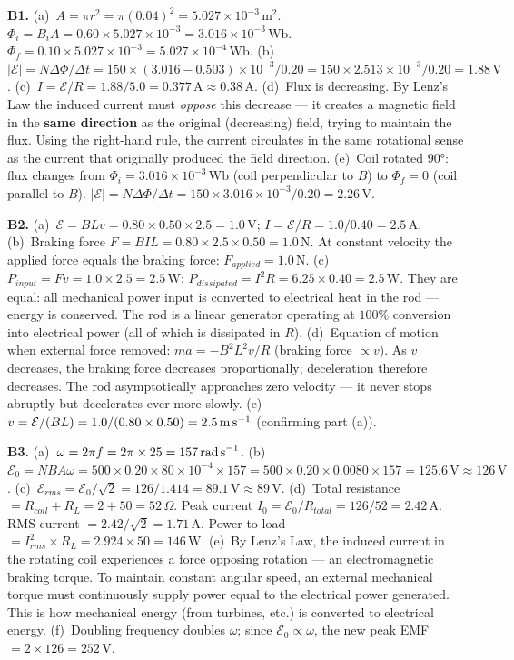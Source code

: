\textbf{B1.}
(a)~$A=\pi r^2=\pi(0.04)^2=5.027\times10^{-3}\,\text{m}^2$.
$\Phi_i=B_iA=0.60\times5.027\times10^{-3}
=3.016\times10^{-3}\,\text{Wb}$.
$\Phi_f=0.10\times5.027\times10^{-3}
=5.027\times10^{-4}\,\text{Wb}$. \quad
(b)~$|\mathcal{E}|=N\Delta\Phi/\Delta t
=150\times(3.016-0.503)\times10^{-3}/0.20
=150\times2.513\times10^{-3}/0.20
=1.88\,\text{V}$. \quad
(c)~$I=\mathcal{E}/R=1.88/5.0=0.377\,\text{A}
\approx0.38\,\text{A}$. \quad
(d)~Flux is decreasing. By Lenz's Law the induced
current must \textit{oppose} this decrease --- it creates
a magnetic field in the \textbf{same direction} as the
original (decreasing) field, trying to maintain the
flux. Using the right-hand rule, the current circulates
in the same rotational sense as the current that
originally produced the field direction. \quad
(e)~Coil rotated $90°$: flux changes from
$\Phi_i=3.016\times10^{-3}\,\text{Wb}$ (coil
perpendicular to $B$) to $\Phi_f=0$ (coil parallel to
$B$).
$|\mathcal{E}|=N\Delta\Phi/\Delta t
=150\times3.016\times10^{-3}/0.20=2.26\,\text{V}$.

\textbf{B2.}
(a)~$\mathcal{E}=BLv=0.80\times0.50\times2.5
=1.0\,\text{V}$;
$I=\mathcal{E}/R=1.0/0.40=2.5\,\text{A}$. \quad
(b)~Braking force $F=BIL
=0.80\times2.5\times0.50=1.0\,\text{N}$.
At constant velocity the applied force equals the
braking force: $F_{applied}=1.0\,\text{N}$. \quad
(c)~$P_{input}=Fv=1.0\times2.5=2.5\,\text{W}$;
$P_{dissipated}=I^2R=6.25\times0.40=2.5\,\text{W}$.
They are equal: all mechanical power input is
converted to electrical heat in the rod ---
energy is conserved. The rod is a linear generator
operating at $100\%$ conversion into electrical
power (all of which is dissipated in $R$). \quad
(d)~Equation of motion when external force removed:
$ma=-B^2L^2v/R$ (braking force $\propto v$).
As $v$ decreases, the braking force decreases
proportionally; deceleration therefore decreases.
The rod asymptotically approaches zero velocity
--- it never stops abruptly but decelerates
ever more slowly. \quad
(e)~$v=\mathcal{E}/(BL)=1.0/(0.80\times0.50)
=2.5\,\text{m\,s}^{-1}$
(confirming part (a)).

\textbf{B3.}
(a)~$\omega=2\pi f=2\pi\times25=157\,\text{rad\,s}^{-1}$.
\quad
(b)~$\mathcal{E}_0=NBA\omega
=500\times0.20\times80\times10^{-4}\times157
=500\times0.20\times0.0080\times157=125.6\,\text{V}
\approx126\,\text{V}$. \quad
(c)~$\mathcal{E}_{rms}=\mathcal{E}_0/\sqrt{2}
=126/1.414=89.1\,\text{V}\approx89\,\text{V}$. \quad
(d)~Total resistance $=R_{coil}+R_L=2+50=52\,\Omega$.
Peak current $I_0=\mathcal{E}_0/R_{total}
=126/52=2.42\,\text{A}$.
RMS current $=2.42/\sqrt{2}=1.71\,\text{A}$.
Power to load $=I_{rms}^2\times R_L
=2.924\times50=146\,\text{W}$. \quad
(e)~By Lenz's Law, the induced current in the rotating
coil experiences a force opposing rotation ---
an electromagnetic braking torque. To maintain constant
angular speed, an external mechanical torque must
continuously supply power equal to the electrical power
generated. This is how mechanical energy (from turbines,
etc.) is converted to electrical energy. \quad
(f)~Doubling frequency doubles $\omega$; since
$\mathcal{E}_0\propto\omega$, the new peak EMF
$=2\times126=252\,\text{V}$.

